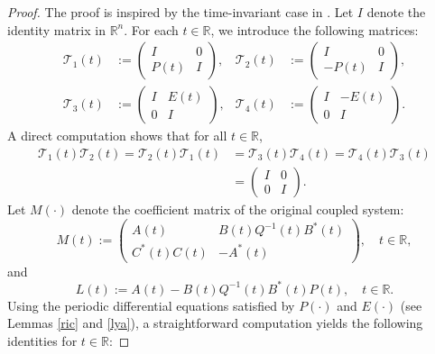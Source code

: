 \documentclass{IEEEtran}
\begin{document}
	\begin{proof}
		The proof is inspired by the time-invariant case in \cite[Lemma 1]{TZZ}. Let $I$ denote the identity matrix in $\mathbb R^n$. For each $t\in\mathbb R$, we introduce the following matrices:
		\begin{align*}
			\mathcal T_1(t)&:=\begin{pmatrix} I&0\\P(t)&I \end{pmatrix}, &
			\mathcal T_2(t)&:=\begin{pmatrix} I&0\\-P(t)&I \end{pmatrix}, \\
			\mathcal T_3(t)&:=\begin{pmatrix} I&E(t)\\0&I \end{pmatrix}, &
			\mathcal T_4(t)&:=\begin{pmatrix} I&-E(t)\\0&I \end{pmatrix}.
		\end{align*}
		A direct computation shows that for all $t\in\mathbb R$,
		\begin{equation}\label{n3191}
			\begin{split}
				\mathcal{T}_1(t)\mathcal{T}_2(t)
				=\mathcal{T}_2(t)\mathcal{T}_1(t)
				&=\mathcal{T}_3(t)\mathcal{T}_4(t)
				=\mathcal{T}_4(t)\mathcal{T}_3(t)\\
				&=\begin{pmatrix}I&0\\0&I\end{pmatrix}.
			\end{split}
		\end{equation}
		Let $M(\cdot)$ denote the coefficient matrix of the original coupled system:
		\begin{equation*}
			M(t):=\begin{pmatrix}
				A(t) & B(t)Q^{-1}(t)B^*(t)\\[1mm]
				C^*(t)C(t) & -A^*(t)
			\end{pmatrix},\quad t\in\mathbb{R},
		\end{equation*}
		and
		\begin{equation*}
			L(t):=A(t)-B(t)Q^{-1}(t)B^*(t)P(t),\quad t\in\mathbb{R}.
		\end{equation*}
		Using the periodic differential equations satisfied by $P(\cdot)$ and $E(\cdot)$ (see Lemmas \ref{ric} and \ref{lya}), a straightforward computation yields the following identities for $t\in \mathbb{R}$:

\end{proof}
\end{document}
